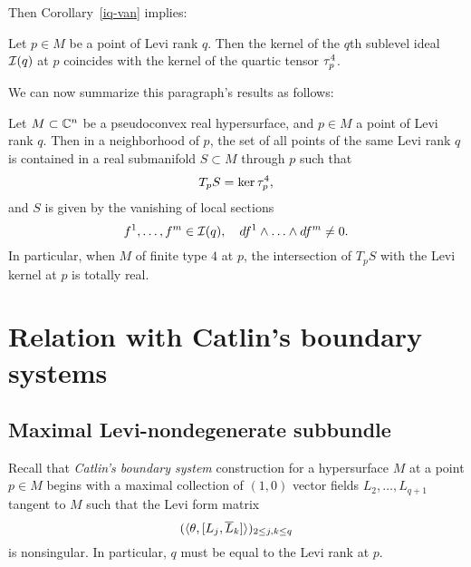 \documentclass[12pt]{amsart}
\begin{document}
Then Corollary~\ref{iq-van} implies:

\bl
Let $p\in M$ be a point of Levi rank $q$.
Then the kernel of the $q$th sublevel ideal ${\mathcal{I}}(q)$ at $p$
coincides with the kernel of the quartic tensor $\tau^4_p$.
\el

We can now summarize this paragraph's results as follows:

\bp{}
Let $M\subset{{\mathbb{C}}^n}$ be a pseudoconvex real hypersurface,
and $p\in M$ a point of Levi rank $q$.
Then in a neighborhood of $p$, 
the set 
 of all points of the same Levi rank $q$
is contained in a real submanifold $S\subset M$
through $p$ such that
$$
	T_p S = \ker \tau^4_p,
$$
and $S$ is given by the vanishing 
of local sections
$$
	f^1, \ldots, f^m \in {\mathcal{I}}(q),
	\quad
	df^1\wedge \ldots \wedge df^m \ne 0.
$$
%
In particular, when $M$ of finite type $4$ at $p$,
the intersection of $T_pS$
with the Levi kernel at $p$ is totally real.
\ep

%
%





\section{Relation with Catlin's boundary systems}
\subsection{Maximal Levi-nondegenerate subbundle}



Recall that {\em Catlin's boundary system} construction
for a hypersurface $M$ at a point $p\in M$
begins with a maximal collection of $(1,0)$ vector fields $L_2, \ldots, L_{q+1}$ tangent to $M$
such that the Levi form matrix 
$$
	(\langle \theta,  [L_j, \overline{L}_k] \rangle)_{2\le j,k \le q}
$$
is nonsingular. In particular, $q$ must be equal to the Levi rank at $p$.
\end{document}

